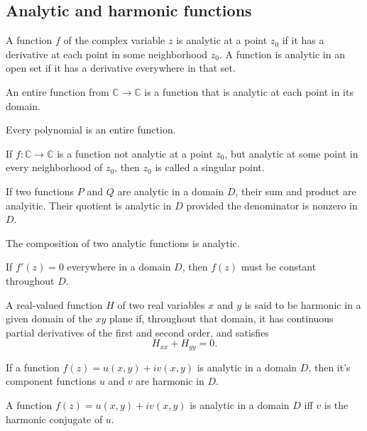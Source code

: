 \documentclass{article}
\begin{document}
\subsection{Analytic and harmonic functions}
\begin{definition}
	A function \(f\) of the complex variable \(z\) is analytic at a point \(z_0\) if it has a derivative at each point in some neighborhood \(z_0\). A function is analytic in an open set if it has a derivative everywhere in that set.
\end{definition}
\begin{definition}
	An entire function from \(\mathbb{C}\rightarrow \mathbb{C}\) is a function that is analytic at each point in its domain.
\end{definition}
\begin{remark}
	Every polynomial is an entire function.
\end{remark}
\begin{definition}
	If \(f:\mathbb{C}\rightarrow\mathbb{C}\) is a function not analytic at a point \(z_0\), but analytic at some point in every neighborhood of \(z_0\), then \(z_0\) is called a singular point.
\end{definition}
\begin{proposition}
	If two functions \(P\) and \(Q\) are analytic in a domain \(D\), their sum and product are analyitic. Their quotient is analytic in \(D\) provided the denominator is nonzero in \(D\).
\end{proposition}
\begin{proposition}
	The composition of two analytic functions is analytic.
\end{proposition}
\begin{theorem}
	If \(f'(z)=0\) everywhere in a domain \(D\), then \(f(z)\) must be constant throughout \(D\).
\end{theorem}
\begin{definition}[Harmonic]
	A real-valued function \(H\) of two real variables \(x\) and \(y\) is said to be harmonic in a given domain of the \(xy\) plane if, throughout that domain, it has continuous partial derivatives of the first and second order, and satisfies
	\begin{equation*}
		H_{xx}+H_{yy}=0.
	\end{equation*}
\end{definition}
\begin{theorem}
	If a function \(f(z)=u(x,y)+iv(x,y)\) is analytic in a domain \(D\), then it's component functions \(u\) and \(v\) are harmonic in \(D\).
\end{theorem}
\begin{theorem}
	A function \(f(z)=u(x,y)+iv(x,y)\) is analytic in a domain \(D\) iff \(v\) is the harmonic conjugate of \(u\).
\end{theorem}
\end{document}
